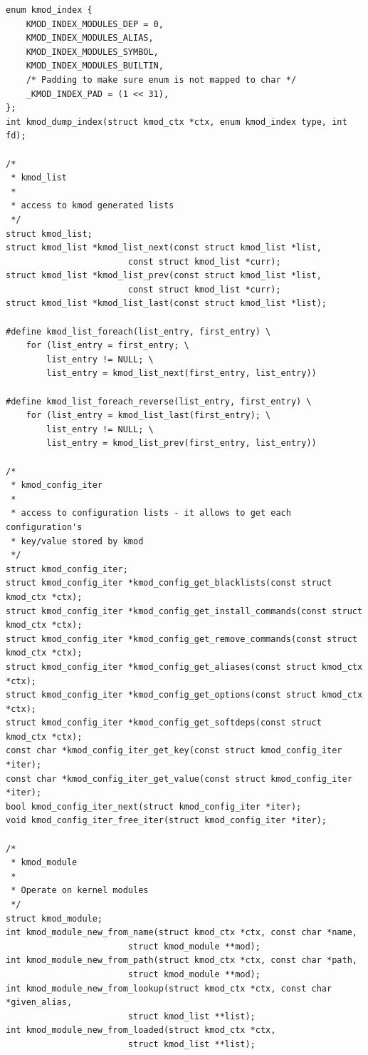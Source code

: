 {\begin{shaded}
\begin{verbatim}
enum kmod_index {
    KMOD_INDEX_MODULES_DEP = 0,
    KMOD_INDEX_MODULES_ALIAS,
    KMOD_INDEX_MODULES_SYMBOL,
    KMOD_INDEX_MODULES_BUILTIN,
    /* Padding to make sure enum is not mapped to char */
    _KMOD_INDEX_PAD = (1 << 31),
};
int kmod_dump_index(struct kmod_ctx *ctx, enum kmod_index type, int fd);

/*
 * kmod_list
 *
 * access to kmod generated lists
 */
struct kmod_list;
struct kmod_list *kmod_list_next(const struct kmod_list *list,
                        const struct kmod_list *curr);
struct kmod_list *kmod_list_prev(const struct kmod_list *list,
                        const struct kmod_list *curr);
struct kmod_list *kmod_list_last(const struct kmod_list *list);

#define kmod_list_foreach(list_entry, first_entry) \
    for (list_entry = first_entry; \
        list_entry != NULL; \
        list_entry = kmod_list_next(first_entry, list_entry))

#define kmod_list_foreach_reverse(list_entry, first_entry) \
    for (list_entry = kmod_list_last(first_entry); \
        list_entry != NULL; \
        list_entry = kmod_list_prev(first_entry, list_entry))

/*
 * kmod_config_iter
 *
 * access to configuration lists - it allows to get each configuration's
 * key/value stored by kmod
 */
struct kmod_config_iter;
struct kmod_config_iter *kmod_config_get_blacklists(const struct kmod_ctx *ctx);
struct kmod_config_iter *kmod_config_get_install_commands(const struct kmod_ctx *ctx);
struct kmod_config_iter *kmod_config_get_remove_commands(const struct kmod_ctx *ctx);
struct kmod_config_iter *kmod_config_get_aliases(const struct kmod_ctx *ctx);
struct kmod_config_iter *kmod_config_get_options(const struct kmod_ctx *ctx);
struct kmod_config_iter *kmod_config_get_softdeps(const struct kmod_ctx *ctx);
const char *kmod_config_iter_get_key(const struct kmod_config_iter *iter);
const char *kmod_config_iter_get_value(const struct kmod_config_iter *iter);
bool kmod_config_iter_next(struct kmod_config_iter *iter);
void kmod_config_iter_free_iter(struct kmod_config_iter *iter);

/*
 * kmod_module
 *
 * Operate on kernel modules
 */
struct kmod_module;
int kmod_module_new_from_name(struct kmod_ctx *ctx, const char *name,
                        struct kmod_module **mod);
int kmod_module_new_from_path(struct kmod_ctx *ctx, const char *path,
                        struct kmod_module **mod);
int kmod_module_new_from_lookup(struct kmod_ctx *ctx, const char *given_alias,
                        struct kmod_list **list);
int kmod_module_new_from_loaded(struct kmod_ctx *ctx,
                        struct kmod_list **list);


\end{verbatim}
\end{shaded}}
